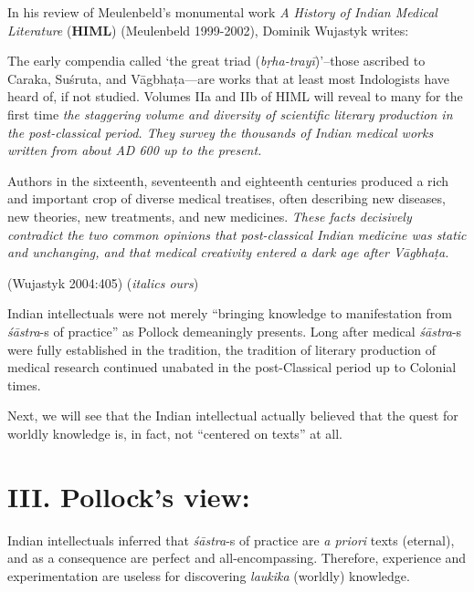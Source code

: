 In his review of Meulenbeld's monumental work {\sl A History of Indian Medical Literature} ({\bf HIML}) (Meulenbeld 1999-2002), Dominik Wujastyk writes:
\begin{myquote}
The early compendia called `the great triad ({\sl bṛha-trayī})'--those ascribed to Caraka, Suśruta, and Vāgbhaṭa---are works that at least most Indologists have heard of, if not studied. Volumes IIa and IIb of HIML will reveal to many for the first time {\sl the staggering volume and diversity of scientific literary production in the post-classical period. They survey the thousands of Indian medical works written from about AD 600 up to the present.} 

Authors in the sixteenth, seventeenth and eighteenth centuries produced a rich and important crop of diverse medical treatises, often describing new diseases, new theories, new treatments, and new medicines. {\sl These facts decisively contradict the two common opinions that post-classical Indian medicine was static and unchanging, and that medical creativity entered a dark age after Vāgbhaṭa.} 

\hfill (Wujastyk 2004:405) ({\sl italics ours})
\end{myquote}

Indian intellectuals were not merely ``bringing knowledge to manifestation from {\sl śāstra}-s of practice'' as Pollock demeaningly presents.  Long after medical {\sl śāstra}-s were fully established in the tradition, the tradition of literary production of medical research continued unabated in the post-Classical period up to Colonial times.

Next, we will see that the Indian intellectual actually believed that the quest for worldly knowledge is, in fact, not ``centered on texts'' at all.

\section*{III. Pollock's view:}

Indian intellectuals inferred that {{\sl śāstra}\relax}-s of practice are {\sl a priori} texts (eternal), and as a consequence are perfect and all-encompassing.  Therefore, experience and experimentation are useless for discovering {{\sl laukika}\relax} (worldly) knowledge.

